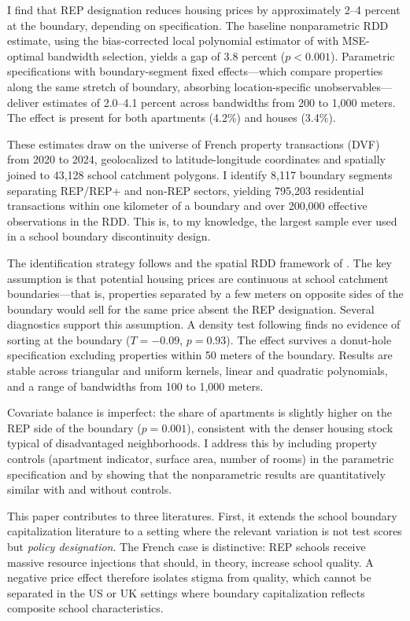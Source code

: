 \documentclass[12pt]{article}
\begin{document}
I find that REP designation reduces housing prices by approximately 2--4 percent at the boundary, depending on specification. The baseline nonparametric RDD estimate, using the bias-corrected local polynomial estimator of \citet{cattaneo2020} with MSE-optimal bandwidth selection, yields a gap of 3.8 percent ($p < 0.001$). Parametric specifications with boundary-segment fixed effects---which compare properties along the same stretch of boundary, absorbing location-specific unobservables---deliver estimates of 2.0--4.1 percent across bandwidths from 200 to 1,000 meters. The effect is present for both apartments (4.2\%) and houses (3.4\%).

These estimates draw on the universe of French property transactions (DVF) from 2020 to 2024, geolocalized to latitude-longitude coordinates and spatially joined to 43,128 school catchment polygons. I identify 8,117 boundary segments separating REP/REP+ and non-REP sectors, yielding 795,203 residential transactions within one kilometer of a boundary and over 200,000 effective observations in the RDD. This is, to my knowledge, the largest sample ever used in a school boundary discontinuity design.

The identification strategy follows \citet{black1999} and the spatial RDD framework of \citet{keele2015}. The key assumption is that potential housing prices are continuous at school catchment boundaries---that is, properties separated by a few meters on opposite sides of the boundary would sell for the same price absent the REP designation. Several diagnostics support this assumption. A density test following \citet{cattaneoJansson2020} finds no evidence of sorting at the boundary ($T = -0.09$, $p = 0.93$). The effect survives a donut-hole specification excluding properties within 50 meters of the boundary. Results are stable across triangular and uniform kernels, linear and quadratic polynomials, and a range of bandwidths from 100 to 1,000 meters.

Covariate balance is imperfect: the share of apartments is slightly higher on the REP side of the boundary ($p = 0.001$), consistent with the denser housing stock typical of disadvantaged neighborhoods. I address this by including property controls (apartment indicator, surface area, number of rooms) in the parametric specification and by showing that the nonparametric results are quantitatively similar with and without controls.

This paper contributes to three literatures. First, it extends the school boundary capitalization literature \citep{black1999, gibbons2013, bayer2007} to a setting where the relevant variation is not test scores but \textit{policy designation}. The French case is distinctive: REP schools receive massive resource injections that should, in theory, increase school quality. A negative price effect therefore isolates stigma from quality, which cannot be separated in the US or UK settings where boundary capitalization reflects composite school characteristics.
\end{document}
